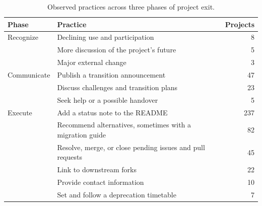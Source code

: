 \begin{table}[tbp]
\caption{Observed practices across three phases of project exit.}
\label{tab:ch8-practices}
\centering\small\renewcommand{\arraystretch}{1.15}
\begin{tabularx}{\linewidth}{@{}>{\raggedright\arraybackslash}p{22mm}>{\raggedright\arraybackslash}Xr@{}}\toprule
Phase & Practice & Projects\\\midrule
Recognize & Declining use and participation & 8\\
 & More discussion of the project's future & 5\\
 & Major external change & 3\\\addlinespace
Communicate & Publish a transition announcement & 47\\
 & Discuss challenges and transition plans & 23\\
 & Seek help or a possible handover & 5\\\addlinespace
Execute & Add a status note to the README & 237\\
 & Recommend alternatives, sometimes with a migration guide & 82\\
 & Resolve, merge, or close pending issues and pull requests & 45\\
 & Link to downstream forks & 22\\
 & Provide contact information & 10\\
 & Set and follow a deprecation timetable & 7\\\bottomrule
\end{tabularx}
\end{table}
